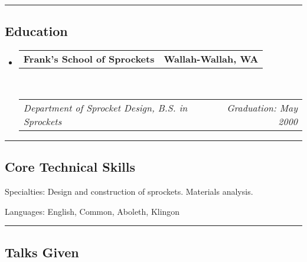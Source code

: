 \documentclass[10pt,letterpaper]{article}
\makeatletter
\newenvironment{indentsection}[1]%
{\begin{list}{}%
	{\setlength{\leftmargin}{#1}}%
	\item[]%
}
{\end{list}}
\newcommand{\headerrow}[2]
{\begin{tabular*}{\linewidth}{l@{\extracolsep{\fill}}r}
	#1 &
	#2 \\
\end{tabular*}}
\makeatother
\begin{document}

\hrule
\vspace{-0.4em}
\subsection*{Education}

\begin{itemize}
	\parskip=0.1em

    \item
    \headerrow
        {\textbf{Frank's School of Sprockets}}
        {\textbf{Wallah-Wallah, WA}}
    \\ 
    \headerrow 
        {\emph{Department of Sprocket Design, B.S. in Sprockets}}
		{\emph{Graduation: May 2000}}

\end{itemize}



\hrule
\vspace{-0.4em}
\subsection*{Core Technical Skills}

\begin{indentsection}{\parindent}
\begin{description*}
    \item[Specialties:]
        Design and construction of sprockets. Materials analysis.
    \item[Languages:] 
        English, Common, Aboleth, Klingon
\end{description*}
\end{indentsection}


\hrule
\vspace{-0.4em}
\subsection*{Talks Given}

\end{document}
